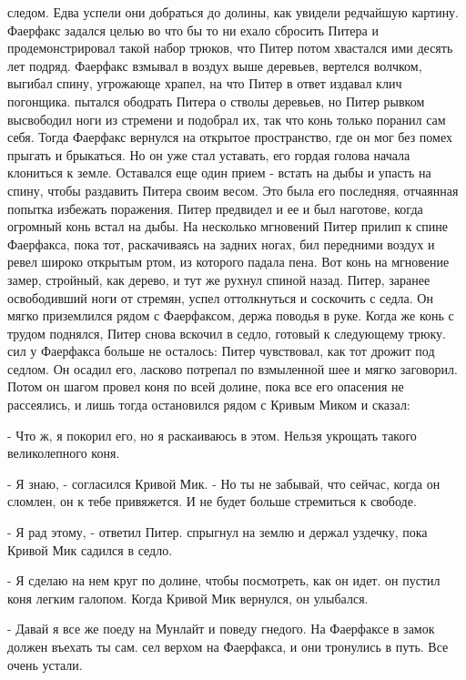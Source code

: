 следом. Едва успели они добраться до долины, как увидели редчайшую 
картину. Фаерфакс задался целью во что бы то ни ехало сбросить Питера 
и продемонстрировал такой набор трюков, что Питер потом хвастался ими 
десять лет подряд. Фаерфакс взмывал в воздух выше деревьев, вертелся 
волчком, выгибал спину, угрожающе храпел, на что Питер в ответ издавал 
клич погонщика.
 пытался ободрать Питера о стволы деревьев, но Питер 
рывком высвободил ноги из стремени и подобрал их, так что конь только 
поранил сам себя. Тогда Фаерфакс вернулся на открытое пространство, 
где он мог без помех прыгать и брыкаться. Но он уже стал уставать, его 
гордая голова начала клониться к земле. Оставался еще один прием - 
встать на дыбы и упасть на спину, чтобы раздавить Питера своим весом. 
Это была его последняя, отчаянная попытка избежать поражения.
 Питер предвидел и ее и был наготове, когда огромный конь встал 
на дыбы. На несколько мгновений Питер прилип к спине Фаерфакса, пока 
тот, раскачиваясь на задних ногах, бил передними воздух и ревел широко 
открытым ртом, из которого падала пена. Вот конь на мгновение замер, 
стройный, как дерево, и тут же рухнул спиной назад. Питер, заранее 
освободивший ноги от стремян, успел оттолкнуться и соскочить с седла. 
Он мягко приземлился рядом с Фаерфаксом, держа поводья в руке. Когда 
же конь с трудом поднялся, Питер снова вскочил в седло, готовый к 
следующему трюку.
 сил у Фаерфакса больше не осталось: Питер чувствовал, как тот 
дрожит под седлом. Он осадил его, ласково потрепал по взмыленной шее и 
мягко заговорил. Потом он шагом провел коня по всей долине, пока все 
его опасения не рассеялись, и лишь тогда остановился рядом с Кривым 
Миком и сказал:
\par- Что ж, я покорил его, но я раскаиваюсь в этом. Нельзя укрощать 
такого великолепного коня.
\par- Я знаю, - согласился Кривой Мик. - Но ты не забывай, что сейчас, 
когда он сломлен, он к тебе привяжется. И не будет больше стремиться к 
свободе.
\par- Я рад этому, - ответил Питер.
 спрыгнул на землю и держал уздечку, пока Кривой Мик садился в 
седло.
\par- Я сделаю на нем круг по долине, чтобы посмотреть, как он идет.
 он пустил коня легким галопом. Когда Кривой Мик вернулся, он 
улыбался.
\par- Давай я все же поеду на Мунлайт и поведу гнедого. На Фаерфаксе в 
замок должен въехать ты сам.
 сел верхом на Фаерфакса, и они тронулись в путь. Все очень 
устали.
